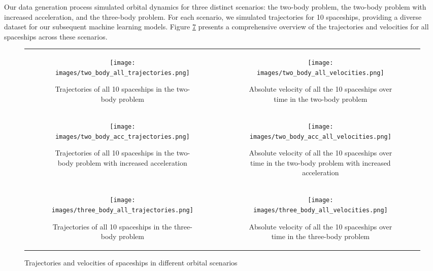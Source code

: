 \documentclass[12pt,a4paper]{article}
\begin{document}
Our data generation process simulated orbital dynamics for three distinct scenarios: the two-body problem, the two-body problem with increased acceleration, and the three-body problem. For each scenario, we simulated trajectories for 10 spaceships, providing a diverse dataset for our subsequent machine learning models. Figure \ref{fig:data_generation_simulation} presents a comprehensive overview of the trajectories and velocities for all spaceships across these scenarios.

\begin{figure}[H]
    \centering
    \begin{tabular}{cc}
        \begin{subfigure}[b]{0.45\textwidth}
            \centering
            \texttt{[image: images/two\_body\_all\_trajectories.png]}
            \caption{Trajectories of all 10 spaceships in the two-body problem}
            \label{fig:two_body_trajectory}
        \end{subfigure} &
        \begin{subfigure}[b]{0.45\textwidth}
            \centering
            \texttt{[image: images/two\_body\_all\_velocities.png]}
            \caption{Absolute velocity of all the 10 spaceships over time in the two-body problem}
            \label{fig:two_body_velocity}
        \end{subfigure} \\
        \begin{subfigure}[b]{0.45\textwidth}
            \centering
            \texttt{[image: images/two\_body\_acc\_trajectories.png]}
            \caption{Trajectories of all 10 spaceships in the two-body problem with increased acceleration}
            \label{fig:two_body_acceleration_trajectory}
        \end{subfigure} &
        \begin{subfigure}[b]{0.45\textwidth}
            \centering
            \texttt{[image: images/two\_body\_acc\_all\_velocities.png]}
            \caption{Absolute velocity of all the 10 spaceships over time in the two-body problem with increased acceleration}
            \label{fig:two_body_acceleration_velocity}
        \end{subfigure} \\
        \begin{subfigure}[b]{0.45\textwidth}
            \centering
            \texttt{[image: images/three\_body\_all\_trajectories.png]}
            \caption{Trajectories of all 10 spaceships in the three-body problem}
            \label{fig:three_body_trajectory}
        \end{subfigure} &
        \begin{subfigure}[b]{0.45\textwidth}
            \centering
            \texttt{[image: images/three\_body\_all\_velocities.png]}
            \caption{Absolute velocity of all the 10 spaceships over time in the three-body problem}
            \label{fig:three_body_velocity}
        \end{subfigure}
    \end{tabular}
    \caption{Trajectories and velocities of spaceships in different orbital scenarios}
    \label{fig:data_generation_simulation}
\end{figure}
\end{document}
